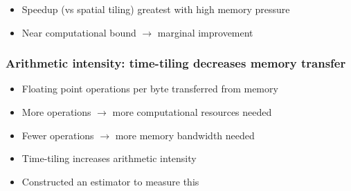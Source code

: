 \documentclass{beamer}
\begin{document}
\begin{frame}
\begin{columns}
\begin{column}{.49\textwidth}
\begin{center}
\end{center}
\end{column}
\end{columns}

\begin{itemize}
	\item Speedup (vs spatial tiling) greatest with high memory pressure
	\item Near computational bound \(\rightarrow\) marginal improvement
\end{itemize}
\end{frame}



\begin{frame}
\frametitle{Arithmetic intensity: time-tiling decreases memory transfer}

\begin{itemize}
	\item Floating point operations per byte transferred from memory
	\item More operations \(\rightarrow\) more computational resources needed
	\item Fewer operations \(\rightarrow\) more memory bandwidth needed
	\newline
	\item Time-tiling increases arithmetic intensity
	\item Constructed an estimator to measure this
\end{itemize}
\end{frame}
\end{document}
